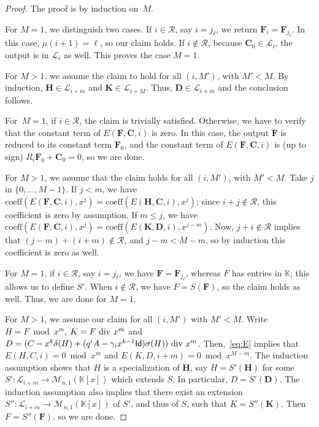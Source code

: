\documentclass[]{sig-alternate}
\def\partial{\delta}
\def\K {\ensuremath{\mathbb{K}}}
\def\Id{\ensuremath{\mathsf{Id}}}
\begin{document}
\begin{proof}
The proof is by induction on~$M$.

 For $M=1$, we
distinguish two cases.  If $i\in\mathcal{R}$, say $i=j_\ell$, we
return $\mathbf{F}_i=\mathbf{F}_{j_\ell}$. In this case, 
$\mu(i+1)=\ell$, so our claim holds. If $i\not\in\mathcal{R}$,
because $\mathbf{C}_0\in\mathscr{L}_{i}$, the output is in
$\mathscr{L}_{i}$ as well. This proves the case $M=1$.

For $M>1$, we assume the claim to hold for all $(i,M')$, with $M'<M$.
By induction, $\mathbf{H}\in\mathscr{L}_{i+m}$ and $\mathbf{K}\in\mathscr{L}_{i+M}$. Thus,
${\mathbf{D}}\in\mathscr{L}_{i+m}$ and the conclusion follows.

\smallskip{} For~$M=1$, if $i\in\mathcal{R}$, the claim is trivially satisfied. Otherwise, we have to
verify that the constant term of $E(\mathbf{F},\mathbf{C},i)$ is
zero. In this case, the output $\mathbf{F}$ is reduced to its constant
term $\mathbf{F}_0$, and the constant term of
$E(\mathbf{F},\mathbf{C},i)$ is (up to sign)
$R_i\mathbf{F}_0+\mathbf{C}_0=0$, so we are done.

For $M>1$, we assume that the claim holds for all $(i,M')$, with
$M'<M$.  Take $j$ in $\{0,\dots,M-1\}$. If $j < m$, we have
$\mathrm{coeff}(E(\mathbf{F},\mathbf{C},i),
x^j)=\mathrm{coeff}(E(\mathbf{H},\mathbf{C},i), x^j)$; since $i+j
\notin \mathcal{R}$, this coefficient is zero by assumption.  If $m
\le j$, we have $\mathrm{coeff}(E(\mathbf{F},\mathbf{C},i),
x^j)=\mathrm{coeff}(E(\mathbf{K},{\mathbf{D}},i), x^{j-m})$. Now, $j+i
\notin \mathcal{R}$ implies that $(j-m)+(i+m) \notin \mathcal{R}$, and
$j-m < M-m$, so by induction this coefficient is zero as well.

\smallskip{} For $M=1$, if $i\in\mathcal{R}$, say $i=j_\ell$, we have
$\mathbf{F}=\mathbf{F}_{j_\ell}$, whereas $F$ has entries in $\K$;
this allows us to define $S'$. When $i\not\in\mathcal{R}$, we
have $F=S(\mathbf{F})$, so the claim holds as well. Thus, we are done
for $M=1$.

For $M>1$, we assume our claim for all $(i,M')$ with $M'<M$.  Write
$H=F \bmod x^m$, $K=F {\rm~div~} x^m$ and ${D}= (C-x^k\partial(H)+
(q^iA-\gamma_i x^{k-1}\Id)\sigma(H)) {\rm~div~}
x^m$. Then,~\eqref{eq:E} implies that $E(H,C,i) = 0\bmod x^m$ and
$E(K,{D},i+m)=0 \bmod x^{M-m}$. The induction assumption shows that
$H$ is a specialization of $\mathbf{H}$, say $H=S'(\mathbf{H})$ for
some $S':\mathscr{L}_{i+m} \to \mathscr{M}_{n,1}(\K[x])$ which extends
$S$. In particular, $D=S'({\mathbf{D}})$. The
induction assumption also implies that there exist an extension
$S'':\mathscr{L}_{i+m} \to \mathscr{M}_{n,1}(\K[x])$ of $S'$, and thus
of $S$, such that $K=S''(\mathbf{K})$. Then $F=S''(\mathbf{F})$, so we
are done.


\end{proof}
\end{document}
